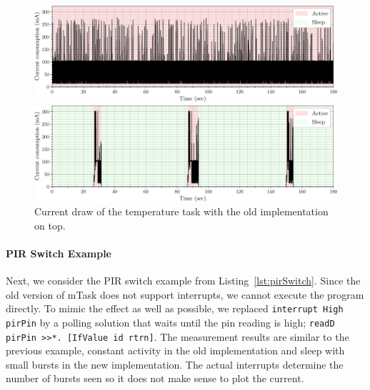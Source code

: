 \documentclass[runningheads]{llncs}
\newcommand{\CleanInline}[1]{\lstinline[language=Clean]!#1!}
\newcommand{\prog}[1]{\CleanInline{#1}}
\begin{document}
\begin{figure}[ht]
	\centering
	\begin{minipage}{0.9\textwidth}
		\includegraphics[width=\textwidth]{temp-old-plot.pdf}
	\end{minipage}
	\begin{minipage}{0.9\textwidth}
		\includegraphics[width=\textwidth]{temp-plot.pdf}
	\end{minipage}
	\caption{Current draw of the temperature task with the old implementation on top.}%
	\label{fig:temp_current}
\end{figure}

\paragraph{PIR Switch Example}

Next, we consider the PIR switch example from Listing~\ref{lst:pirSwitch}.
Since the old version of mTask does not support interrupts, we cannot execute the program directly.
To mimic the effect as well as possible, we replaced \prog{interrupt High pirPin} by a polling solution that waits until the pin reading is high; \prog{readD pirPin >>*. [IfValue id rtrn]}.
The measurement results are similar to the previous example, constant activity in the old implementation and sleep with small bursts in the new implementation.
The actual interrupts determine the number of bursts seen so it does not make sense to plot the current.
\end{document}

